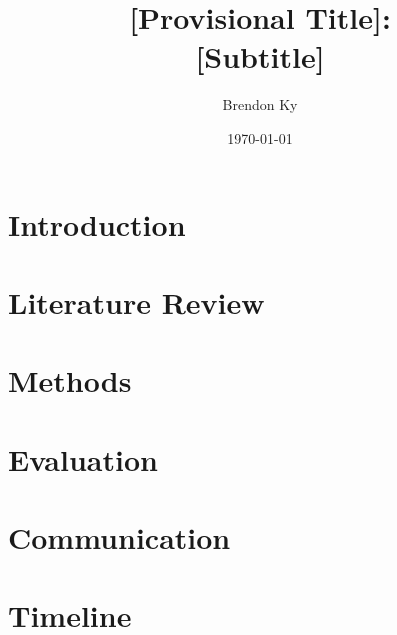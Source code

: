 \documentclass{article}
\title{
    [Provisional Title]: \\
    \large [Subtitle]
}
\author{Brendon Ky}
\date{\today}
\begin{document}
\maketitle

\section{Introduction}

\section{Literature Review}

\section{Methods}

\section{Evaluation}

\section{Communication}

\section{Timeline}
\end{document}
